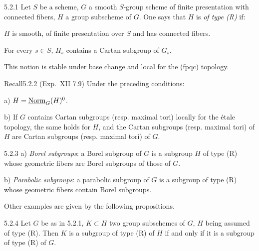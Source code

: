 \begin{definition}{5.2.1}\label{XXII.5.2.1}
Let $S$ be a scheme, $G$ a smooth $S$-group scheme of finite presentation with connected fibers,{\renewcommand{\thefootnote}{(25)}} $H$ a group subscheme of $G$. One says that $H$ is \emph{of type (R)} if:
\begin{enumeratei}
\item $H$ is smooth, of finite presentation over $S$ and has connected fibers.{\renewcommand{\thefootnote}{(25)}\footnotemark[26]}
\item For every $s\in S$, $H_{\overline s}$ contains a Cartan subgroup of $G_{\overline s}$.
\end{enumeratei}
This notion is stable under base change and local for the (fpqc) topology.
\end{definition}
\begin{enoncerm}{Recall}{5.2.2}\label{XXII.5.2.2}
(\cf Exp.~XII 7.9) Under the preceding conditions:

a) $H=\underline{\mathrm{Norm}}_G(H)^0$.

b) If $G$ contains Cartan subgroups (resp. maximal tori) locally for the \'etale topology, the same holds for $H$, and the Cartan subgroups (resp. maximal tori) of $H$ are Cartan subgroups (resp. maximal tori) of $G$.
\end{enoncerm}
\begin{examples}{5.2.3}\label{XXII.5.2.3}
a) \emph{Borel subgroups}: a Borel subgroup of $G$ is a subgroup $H$ of type (R) whose geometric fibers are Borel subgroups of those of $G$.{\renewcommand{\thefootnote}{(26)}}

b) \emph{Parabolic subgroups}: a parabolic subgroup of $G$ is a subgroup of type (R) whose geometric fibers contain Borel subgroups.
\end{examples}
Other examples are given by the following propositions.
\begin{proposition}{5.2.4}\label{XXII.5.2.4}
Let $G$ be as in 5.2.1, $K\subset H$ two group subschemes of $G$, $H$ being assumed of type (R). Then $K$ is a subgroup of type (R) of $H$ if and only if it is a subgroup of type (R) of $G$.
\end{proposition}
